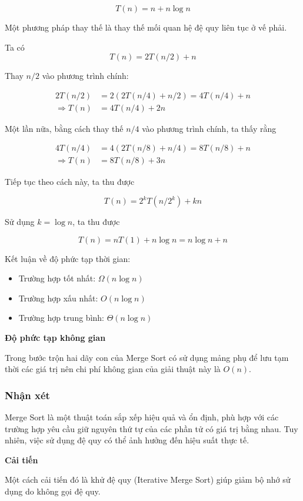 $$T(n) = n +  n\log{n}$$

Một phương pháp thay thế là thay thế mối quan hệ đệ quy liên tục ở vế phải.

Ta có 
$$T(n) = 2T(n/2) + n$$

Thay $n/2$ vào phương trình chính:

\begin{align*}
    2T(n/2) &= 2(2T(n/4) + n / 2) = 4T(n/4) + n \\
    \Rightarrow T(n) &= 4T(n / 4) + 2n
\end{align*}

Một lần nữa, bằng cách thay thế $n/4$ vào phương trình chính, ta thấy rằng 

\begin{align*}
    4T(n/4) &= 4(2T(n/8) + n / 4) = 8T(n/8) + n \\
    \Rightarrow T(n) &= 8T(n / 8) + 3n
\end{align*}

Tiếp tục theo cách này, ta thu được

$$T(n) = 2^kT(n/2^k) + kn$$


Sử dụng $k = \log{n}$, ta thu được

$$T(n) = nT(1) + n\log{n} = n\log{n} + n$$

Kết luận về độ phức tạp thời gian:

 \begin{itemize}
    \item Trường hợp tốt nhất: $\Omega(n\log{n})$ 
    \item Trường hợp xấu nhất: $O(n\log{n})$
    \item Trường hợp trung bình: $\Theta(n\log{n})$
\end{itemize}

\textbf{Độ phức tạp không gian}

Trong bước trộn hai dãy con của Merge Sort có sử dụng mảng phụ để lưu tạm thời các giá trị nên chi phí không gian của giải thuật này là $O(n)$.

\subsubsection{Nhận xét}

Merge Sort là một thuật toán sắp xếp hiệu quả và ổn định, phù hợp với các trường hợp yêu cầu giữ nguyên thứ tự của các phần tử có giá trị bằng nhau. Tuy nhiên, việc sử dụng đệ quy có thể ảnh hưởng đến hiệu suất thực tế. 

\textbf{Cải tiến}

Một cách cải tiến đó là khử đệ quy (Iterative Merge Sort) giúp  giảm bộ nhớ sử dụng do không gọi đệ quy.